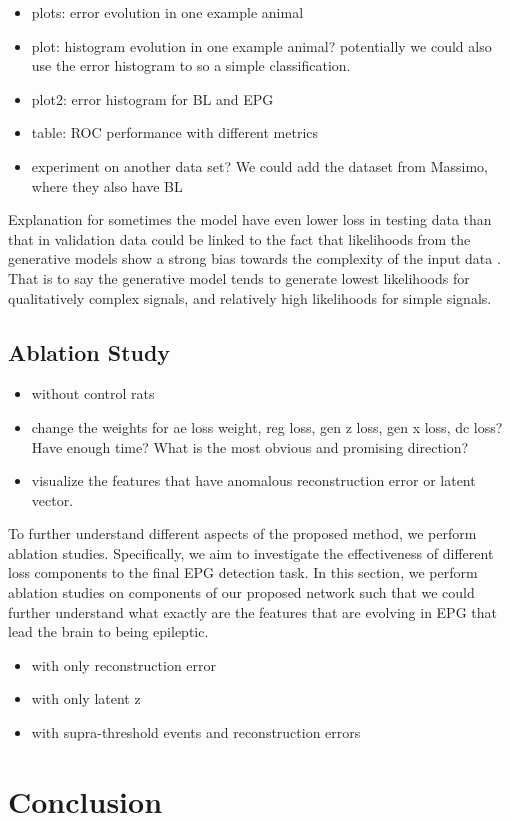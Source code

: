 \documentclass{article}
\begin{document}
	\begin{itemize}
		\item plots: error evolution in one example animal
		\item plot: histogram evolution in one example animal? potentially we could also use the error histogram to so a simple classification.
		\item plot2: error histogram for BL and EPG
		\item table: ROC performance with different metrics
		\item experiment on another data set? We could add the dataset from Massimo, where they also have BL
	\end{itemize}
	
	Explanation for sometimes the model have even lower loss in testing data than that in validation data could be linked to the fact that likelihoods from the generative models show a strong bias towards the complexity of the input data \cite{serra2019input, schirrmeister2020understanding, ren2019likelihood}. That is to say the generative model tends to generate lowest likelihoods for qualitatively complex signals, and relatively high likelihoods for simple signals.
	
	
	\subsection{Ablation Study}
	\begin{itemize}
		\item without control rats
		\item change the weights for ae loss weight, reg loss, gen z loss, gen x loss, dc loss? Have enough time? What is the most obvious and promising direction?
		\item visualize the features that have anomalous reconstruction error or latent vector.
	\end{itemize}
	
	
	To further understand different aspects of the proposed method, we perform ablation studies. Specifically, we aim to investigate the effectiveness of different loss components to the final EPG detection task. In this section, we perform ablation studies on components of our proposed network such that we could further understand what exactly are the features that are evolving in EPG that lead the brain to being epileptic.
	\begin{itemize}
		\item with only reconstruction error
		\item with only latent z
		\item with supra-threshold events and reconstruction errors
	\end{itemize}
	
	\section{Conclusion}
	
	
	
	
	
	
	
	
	
\end{document}
